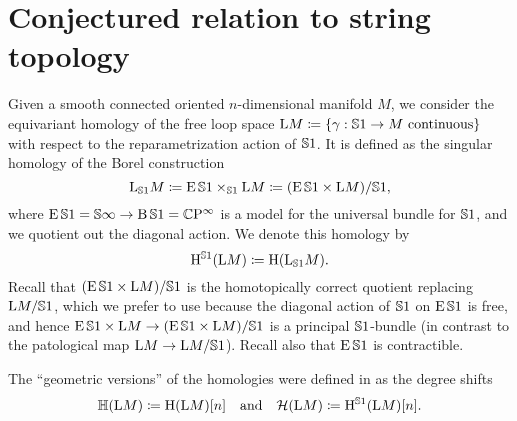 \documentclass[\MainFolder/Text.tex]{subfiles}
\begin{document}
 
\section{Conjectured relation to string topology}\label{Sec:StringTopology}


Given a smooth connected oriented $n$-dimensional manifold $M$, we consider the equivariant homology of the free loop space $\mathrm{L} M \coloneqq \{\gamma: \mathbb{S}{1} \rightarrow M \text{ continuous}\}$ with respect to the reparametrization action of $\mathbb{S}{1}$. It is defined as the singular homology of the Borel construction  
$$ \mathrm{L}_{\mathbb{S}{1}} M \coloneqq \operatorname{E}\mathbb{S}{1} \times_{\mathbb{S}{1}} \mathrm{L} M \coloneqq (\operatorname{E}\mathbb{S}{1}\times \mathrm{L} M)/\mathbb{S}{1}, $$
where $\operatorname{E}\mathbb{S}{1} = \mathbb{S}{\infty} \rightarrow \operatorname{B} \mathbb{S}{1} = \mathbb{C}\mathrm{P}^\infty$ is a model for the universal bundle for $\mathbb{S}{1}$, and we quotient out the diagonal action. We denote this homology by
$$ \mathrm{H}^{\mathbb{S}{1}}(\mathrm{L} M) \coloneqq \mathrm{H}(\mathrm{L}_{\mathbb{S}{1}} M). $$
Recall that $(\operatorname{E}\mathbb{S}{1}\times \mathrm{L} M)/\mathbb{S}{1}$ is the homotopically correct quotient replacing $\mathrm{L} M/\mathbb{S}{1}$, which we prefer to use because the diagonal action of $\mathbb{S}{1}$ on $\operatorname{E}\mathbb{S}{1}$ is free, and hence $\operatorname{E}\mathbb{S}{1}\times \mathrm{L} M \rightarrow (\operatorname{E}\mathbb{S}{1}\times \mathrm{L} M)/\mathbb{S}{1}$ is a principal $\mathbb{S}{1}$-bundle (in contrast to the patological map $\mathrm{L} M \rightarrow \mathrm{L} M /\mathbb{S}{1}$). Recall also that $\operatorname{E} \mathbb{S}{1}$ is contractible.


The ``geometric versions'' of the homologies were defined in \cite{Sullivan1999} as the degree shifts
$$ \mathbb{H}(\mathrm{L} M) \coloneqq \mathrm{H}(\mathrm{L} M)[n]\quad\text{and}\quad \mathcal{H}(\mathrm{L} M)\coloneqq \mathrm{H}^{\mathbb{S}{1}}(\mathrm{L} M)[n]. $$
\end{document}
